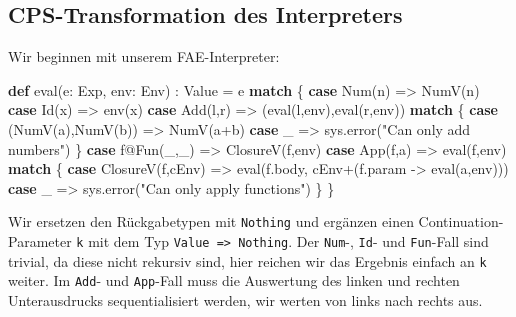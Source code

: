 \documentclass[]{article}
\newenvironment{Shaded}{}{}
\newcommand{\FunctionTok}[1]{\textcolor[rgb]{0.02,0.16,0.49}{#1}}
\newcommand{\KeywordTok}[1]{\textcolor[rgb]{0.00,0.44,0.13}{\textbf{#1}}}
\newcommand{\NormalTok}[1]{#1}
\newcommand{\StringTok}[1]{\textcolor[rgb]{0.25,0.44,0.63}{#1}}
\begin{document}
\hypertarget{cps-transformation-des-interpreters}{%
\subsection{CPS-Transformation des
Interpreters}\label{cps-transformation-des-interpreters}}

Wir beginnen mit unserem FAE-Interpreter:

\begin{Shaded}
\begin{Highlighting}[]
\KeywordTok{def} \FunctionTok{eval}\NormalTok{(e: Exp, env: Env) : Value = e }\KeywordTok{match}\NormalTok{ \{}
  \KeywordTok{case} \FunctionTok{Num}\NormalTok{(n) =\textgreater{} }\FunctionTok{NumV}\NormalTok{(n)}
  \KeywordTok{case} \FunctionTok{Id}\NormalTok{(x) =\textgreater{} }\FunctionTok{env}\NormalTok{(x)}
  \KeywordTok{case} \FunctionTok{Add}\NormalTok{(l,r) =\textgreater{} (}\FunctionTok{eval}\NormalTok{(l,env),}\FunctionTok{eval}\NormalTok{(r,env)) }\KeywordTok{match}\NormalTok{ \{}
    \KeywordTok{case}\NormalTok{ (}\FunctionTok{NumV}\NormalTok{(a),}\FunctionTok{NumV}\NormalTok{(b)) =\textgreater{} }\FunctionTok{NumV}\NormalTok{(a+b)}
    \KeywordTok{case}\NormalTok{ \_ =\textgreater{} sys.}\FunctionTok{error}\NormalTok{(}\StringTok{"Can only add numbers"}\NormalTok{)}
\NormalTok{  \}}
  \KeywordTok{case}\NormalTok{ f@}\FunctionTok{Fun}\NormalTok{(\_,\_) =\textgreater{} }\FunctionTok{ClosureV}\NormalTok{(f,env)}
  \KeywordTok{case} \FunctionTok{App}\NormalTok{(f,a) =\textgreater{} }\FunctionTok{eval}\NormalTok{(f,env) }\KeywordTok{match}\NormalTok{ \{}
    \KeywordTok{case} \FunctionTok{ClosureV}\NormalTok{(f,cEnv) =\textgreater{}}
      \FunctionTok{eval}\NormalTok{(f.}\FunctionTok{body}\NormalTok{, cEnv+(f.}\FunctionTok{param}\NormalTok{ {-}\textgreater{} }\FunctionTok{eval}\NormalTok{(a,env)))}
    \KeywordTok{case}\NormalTok{ \_ =\textgreater{} sys.}\FunctionTok{error}\NormalTok{(}\StringTok{"Can only apply functions"}\NormalTok{)}
\NormalTok{  \}}
\NormalTok{\}}
\end{Highlighting}
\end{Shaded}

Wir ersetzen den Rückgabetypen mit \texttt{Nothing} und ergänzen einen
Continuation-Parameter \texttt{k} mit dem Typ
\texttt{Value\ =\textgreater{}\ Nothing}. Der \texttt{Num}-,
\texttt{Id}- und \texttt{Fun}-Fall sind trivial, da diese nicht rekursiv
sind, hier reichen wir das Ergebnis einfach an \texttt{k} weiter. Im
\texttt{Add}- und \texttt{App}-Fall muss die Auswertung des linken und
rechten Unterausdrucks sequentialisiert werden, wir werten von links
nach rechts aus.
\end{document}
